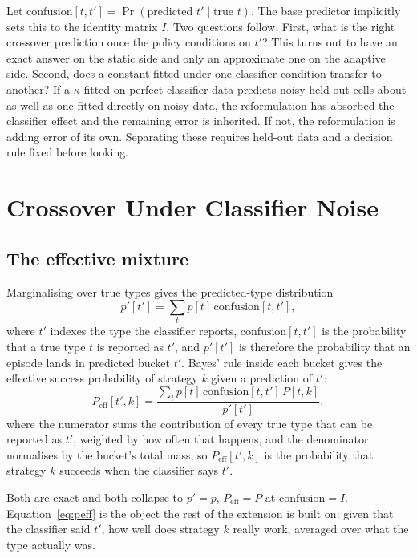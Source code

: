 \documentclass[conference]{IEEEtran}
\begin{document}
Let $\mathrm{confusion}[t,t'] = \Pr(\text{predicted } t' \mid \text{true } t)$.
The base predictor implicitly sets this to the identity matrix $I$. Two
questions follow. First, what is the right crossover prediction once the policy
conditions on $t'$? This turns out to have an exact answer on the static side
and only an approximate one on the adaptive side. Second, does a constant
fitted under one classifier condition transfer to another? If a $\kappa$ fitted
on perfect-classifier data predicts noisy held-out cells about as well as one
fitted directly on noisy data, the reformulation has absorbed the classifier
effect and the remaining error is inherited. If not, the reformulation is
adding error of its own. Separating these requires held-out data and a decision
rule fixed before looking.

\section{Crossover Under Classifier Noise}
\label{sec:noise}

\subsection{The effective mixture}

Marginalising over true types gives the predicted-type distribution
\begin{equation}
p'[t'] = \sum_{t} p[t]\, \mathrm{confusion}[t,t'],
\label{eq:pprime}
\end{equation}
where $t'$ indexes the type the classifier reports,
$\mathrm{confusion}[t,t']$ is the probability that a true type $t$ is reported
as $t'$, and $p'[t']$ is therefore the probability that an episode lands in
predicted bucket $t'$. Bayes' rule inside each bucket gives the effective
success probability of strategy $k$ given a prediction of $t'$:
\begin{equation}
P_{\mathrm{eff}}[t',k] = \frac{\sum_{t} p[t]\,\mathrm{confusion}[t,t']\,P[t,k]}
{p'[t']},
\label{eq:peff}
\end{equation}
where the numerator sums the contribution of every true type that can be
reported as $t'$, weighted by how often that happens, and the denominator
normalises by the bucket's total mass, so $P_{\mathrm{eff}}[t',k]$ is the
probability that strategy $k$ succeeds when the classifier says $t'$.

Both are exact and both collapse to $p' = p$, $P_{\mathrm{eff}} = P$ at
$\mathrm{confusion} = I$. Equation~\eqref{eq:peff} is the object the rest of
the extension is built on: given that the classifier said $t'$, how well does
strategy $k$ really work, averaged over what the type actually was.
\end{document}
